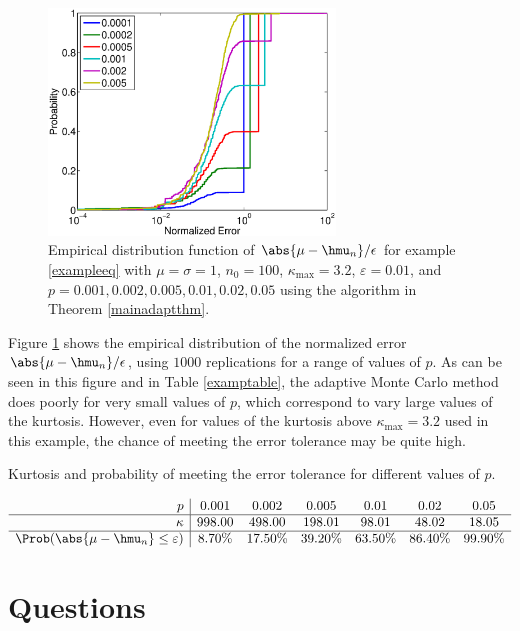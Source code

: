 \documentclass[12pt]{amsart}
\begin{document}
\begin{figure}
\includegraphics[width=3in]{NormalErrFig.eps}
\caption{Empirical distribution function of $\abs{\mu-\hmu_n}/\epsilon$ for example \eqref{exampleeq} with $\mu=\sigma=1$, $n_0=100$, $\kappa_{\max} = 3.2$, $\varepsilon=0.01$, and  $p=0.001, 0.002, 0.005, 0.01, 0.02, 0.05$ using the algorithm in Theorem \ref{mainadaptthm}. \label{normalerrfig}}
\end{figure}

Figure \ref{normalerrfig} shows the empirical distribution of the normalized error $\abs{\mu-\hmu_n}/\epsilon$, using $1000$ replications for a range of values of $p$.  As can be seen in this figure and in Table \ref{examptable}, the adaptive Monte Carlo method does poorly for very small values of $p$, which correspond to vary large values of the kurtosis.  However, even for values of the kurtosis above $\kappa_{\max}=3.2$ used in this example, the chance of meeting the error tolerance may be quite high.

\begin{table}
\caption{Kurtosis and probability of meeting the error tolerance for different values of $p$. \label{examptable}}
\[
\begin{array}{r|ccccccccccc}
p &   0.001 &    0.002 &    0.005 &     0.01 &     0.02 &     0.05 \\
\hline
\kappa &  998.00 &   498.00 &   198.01 &    98.01 &    48.02 &    18.05 \\
\hline
\Prob(\abs{\mu-\hmu_n} \le \varepsilon) &    8.70\% &    17.50\% &    39.20\% &    63.50\% &    86.40\% &    99.90\% \\
\end{array}
\]
\end{table}


\section{Questions}
\end{document}
